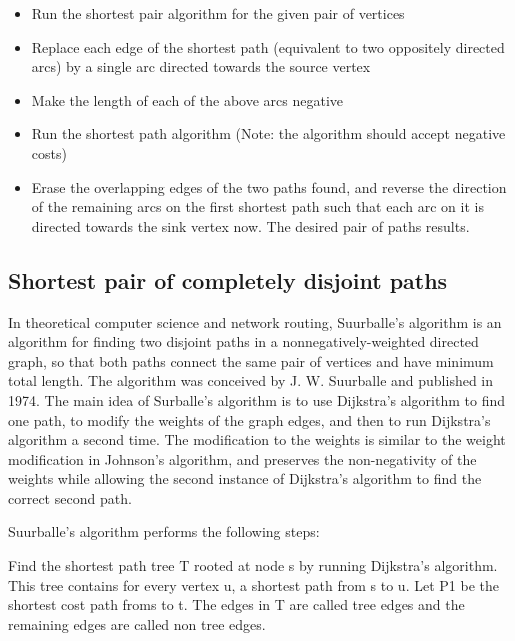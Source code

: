 \documentclass[10pt,letterpaper,twocolumn,twosided]{article}
\begin{document}
\begin{itemize}

\item Run the shortest pair algorithm for the given pair of vertices

\item Replace each edge of the shortest path (equivalent to two oppositely directed arcs) by a single arc directed 
towards the source vertex

\item Make the length of each of the above arcs negative

\item Run the shortest path algorithm (Note: the algorithm should accept negative costs)

\item Erase the overlapping edges of the two paths found, and reverse the direction of the remaining arcs on the 
first shortest path such that each arc on it is directed towards the sink vertex now. The desired pair of 
paths results.

\end{itemize}

\subsection{Shortest pair of completely disjoint paths}

In theoretical computer science and network routing, Suurballe's algorithm is an algorithm for finding two
disjoint paths in a nonnegatively-weighted directed graph, so that both paths connect the same pair of vertices
and have minimum total length. The algorithm was conceived by J. W. Suurballe and published in 1974. The main idea
of Surballe's algorithm is to use Dijkstra's algorithm to find one path, to modify the weights of the graph edges,
and then to run Dijkstra's algorithm a second time. The modification to the weights is similar to the weight 
modification in Johnson's algorithm, and preserves the non-negativity of the weights while allowing the second
instance of Dijkstra's algorithm to find the correct second path.

Suurballe's algorithm performs the following steps:

Find the shortest path tree T rooted at node s by running Dijkstra's algorithm. This tree contains for every vertex u,
a shortest path from s to u. Let P1 be the shortest cost path froms to t. The edges in T are called tree edges
and the remaining edges are called non tree edges.
\end{document}

